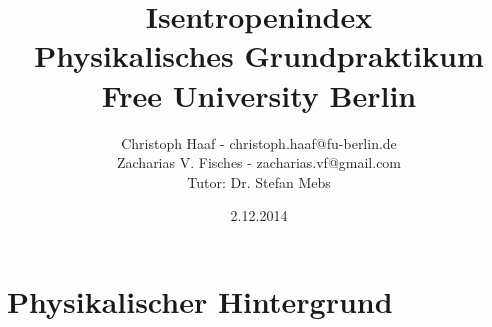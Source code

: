 \documentclass[%
   final,      %
   paper=a4, paper=portrait, pagesize=auto, %
   fontsize=11pt, %
   ngerman, %
 ]{scrartcl} %
\begin{document}
%

\subject{Protokoll}
\title{Isentropenindex \\ \normalsize Physikalisches Grundpraktikum \\ Free University Berlin}
\date{2.12.2014}
\author{Christoph Haaf - christoph.haaf@fu-berlin.de  \\ Zacharias V. Fisches - zacharias.vf@gmail.com \\ Tutor: Dr. Stefan Mebs}


\maketitle




\tableofcontents
\newpage

%
%

%

\section{Physikalischer Hintergrund}
\end{document}
